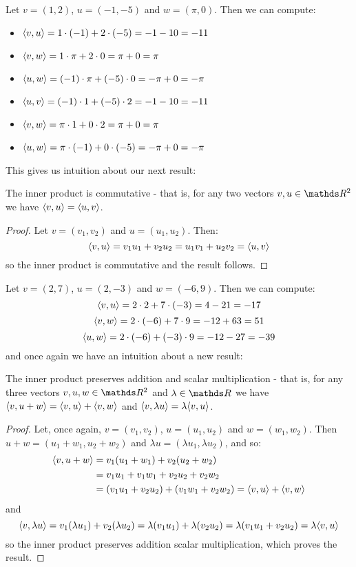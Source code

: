 \begin{ex}
	Let $v=(1,2)$, $u=(-1,-5)$ and $w=(\pi,0)$. Then we can compute:
	\begin{multicols}{2}
		\begin{itemize}
			\item[] \(\langle v,u\rangle=1\cdot(-1)+2\cdot (-5)=-1-10=-11\)
			\item[] \(\langle v,w\rangle=1\cdot\pi+2\cdot 0=\pi+0=\pi\)
			\item[] \(\langle u,w\rangle=(-1)\cdot\pi+(-5)\cdot 0=-\pi+0=-\pi\)
			\item[] \(\langle u,v\rangle=(-1)\cdot 1+(-5)\cdot 2=-1-10=-11\)
			\item[] \(\langle v,w\rangle=\pi\cdot 1+0\cdot2=\pi+0=\pi\)
			\item[] \(\langle u,w\rangle=\pi\cdot(-1)+0\cdot (-5)=-\pi+0=-\pi\)
		\end{itemize}
	\end{multicols}

This gives us intuition about our next result:
\end{ex}

\begin{prop}
	The inner product is commutative - that is, for any two vectors $v,u\in \R^2$ we have $\langle v,u\rangle=\langle u,v\rangle$.
\end{prop}
\begin{proof}
	Let $v=(v_1,v_2)$ and $u=(u_1,u_2)$. Then:
	\[\langle v,u\rangle=v_1u_1+v_2u_2=u_1v_1+u_2v_2=\langle u,v\rangle\]so the inner product is commutative and the result follows.
\end{proof}

\begin{ex}
	Let $v=(2,7)$, $u=(2,-3)$ and $w=(-6,9)$. Then we can compute:
	\[\langle v,u\rangle=2\cdot 2+7\cdot(-3)=4-21=-17\]
	\[\langle v,w\rangle=2\cdot(-6)+7\cdot 9=-12+63=51\]
	\[\langle u,w\rangle=2\cdot (-6)+(-3)\cdot 9=-12-27=-39\]and once again we have an intuition about a new result:
\end{ex}
\begin{prop}
	The inner product preserves addition and scalar multiplication - that is, for any three vectors $v,u,w\in \R^2$ and $\lambda\in \R$ we have $\langle v,u+w\rangle=\langle v,u\rangle+\langle v,w\rangle$ and $\langle v,\lambda u\rangle=\lambda\langle v,u\rangle$.
\end{prop}
\begin{proof}
	Let, once again, $v=(v_1,v_2)$, $u=(u_1,u_2)$ and $w=(w_1,w_2)$. Then $u+w=(u_1+w_1,u_2+w_2)$ and $\lambda u=(\lambda u_1,\lambda u_2)$, and so:
	\begin{align*}
		\langle v,u+w\rangle&=v_1(u_1+w_1)+v_2(u_2+w_2)\\
		&=v_1u_1+v_1w_1+v_2u_2+v_2w_2\\
		&=(v_1u_1+v_2u_2)+(v_1w_1+v_2w_2)=\langle v,u\rangle+\langle v,w\rangle
	\end{align*}and
	\[\langle v,\lambda u\rangle=v_1(\lambda u_1)+v_2(\lambda u_2)=\lambda(v_1u_1)+\lambda (v_2u_2)=\lambda(v_1u_1+v_2u_2)=\lambda\langle v,u\rangle\]so the inner product preserves addition scalar multiplication, which proves the result.
\end{proof}

